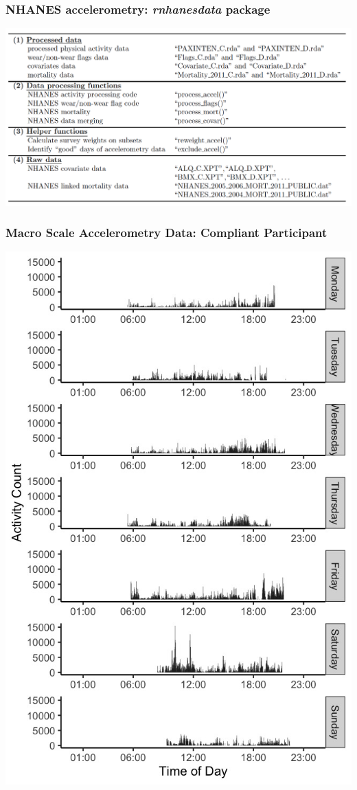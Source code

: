 \documentclass[10pt]{beamer}\usepackage[]{graphicx}\usepackage[]{color}
\begin{document}
\begin{frame}
\frametitle{NHANES accelerometry: {\it rnhanesdata} package}
\includegraphics[width=\textwidth]{rnhanesdata}
\end{frame}




\begin{frame}
\frametitle{Macro Scale Accelerometry Data: Compliant Participant}
\centering
\includegraphics[height=\textheight]{profile_id1}
\end{frame}
\end{document}
